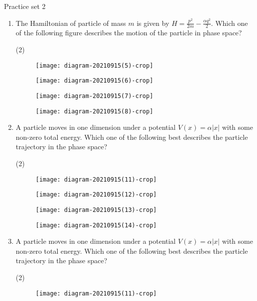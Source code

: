 \newpage
\begin{abox}
	Practice set 2
	\end{abox}
\begin{enumerate}
	\item The Hamiltonian of particle of mass $m$ is given by $H=\frac{p^{2}}{2 m}-\frac{\alpha q^{2}}{2}$. Which one of the following figure describes the motion of the particle in phase space?
	{}

\begin{tasks}(2)
	\task[\textbf{A.}]\begin{figure}[H]
		\centering
		\texttt{[image: diagram-20210915(5)-crop]}
	\end{figure}
	\task[\textbf{B.}]\begin{figure}[H]
		\centering
		\texttt{[image: diagram-20210915(6)-crop]}
	\end{figure}
	\task[\textbf{C.}]\begin{figure}[H]
		\centering
		\texttt{[image: diagram-20210915(7)-crop]}
	\end{figure}
	\task[\textbf{D.}]\begin{figure}[H]
		\centering
		\texttt{[image: diagram-20210915(8)-crop]}
	\end{figure}
\end{tasks}
	\item A particle moves in one dimension under a potential $V(x)=\alpha|x|$ with some non-zero total energy. Which one of the following best describes the particle trajectory in the phase space?
	{}

\begin{tasks}(2)
	\task[\textbf{A.}]\begin{figure}[H]
		\centering
		\texttt{[image: diagram-20210915(11)-crop]}
		
	\end{figure}
	\task[\textbf{B.}]\begin{figure}[H]
		\centering
		\texttt{[image: diagram-20210915(12)-crop]}
	\end{figure}
	\task[\textbf{C.}]\begin{figure}[H]
		\centering
		\texttt{[image: diagram-20210915(13)-crop]}
	\end{figure}
	\task[\textbf{D.}]\begin{figure}[H]
		\centering
		\texttt{[image: diagram-20210915(14)-crop]}
	\end{figure}
\end{tasks}	
	\item A particle moves in one dimension under a potential $V(x)=\alpha|x|$ with some non-zero total energy. Which one of the following best describes the particle trajectory in the phase space?
	{}
\begin{tasks}(2)
	\task[\textbf{A.}]\begin{figure}[H]
		\centering
		\texttt{[image: diagram-20210915(11)-crop]}
		

\end{figure}
\end{tasks}
\end{enumerate}
